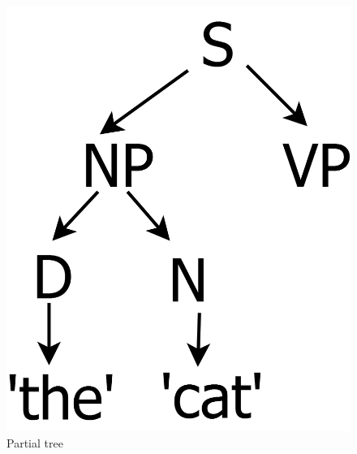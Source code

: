 \begin{figure}[ht]
\centering
\begin{minipage}[b]{0.3\linewidth}
\includegraphics[width=\linewidth]{tree-1.png}
\caption{Partial tree}
\label{tree-1}
\end{minipage}
\quad
\begin{minipage}[b]{0.3\linewidth}

\end{minipage}
\end{figure}

